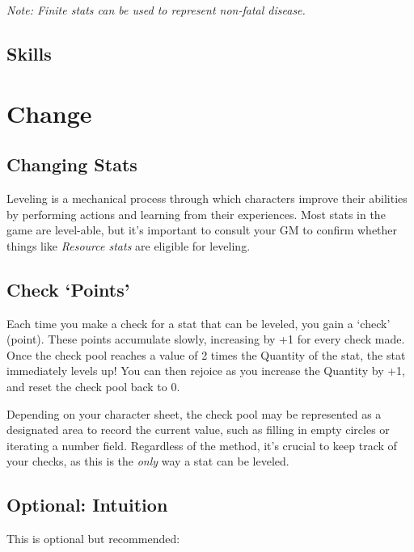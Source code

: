 \documentclass[../main.tex]{subfiles}
\begin{document}
        \emph{Note: Finite stats can be used to represent non-fatal disease.}
        \begin{mdframed}[style=Arrata]
            {\em
                \lipsum[1]
            }
        \end{mdframed}

    \subsection{Skills}

    \section{Change}

    \subsection{Changing Stats}\label{changing stats}

    Leveling is a mechanical process through which characters improve their abilities by performing actions and learning from their experiences. Most stats in the game are level-able, but it's important to consult your GM to confirm whether things like \emph{Resource stats} are eligible for leveling.

    \subsection{Check `Points'}

    Each time you make a check for a stat that can be leveled, you gain a `check' (point). These points accumulate slowly, increasing by +1 for every check made. Once the check pool reaches a value of 2 times the Quantity of the stat, the stat immediately levels up! You can then rejoice as you increase the Quantity by +1, and reset the check pool back to 0.

    Depending on your character sheet, the check pool may be represented as a designated area to record the current value, such as filling in empty circles or iterating a number field. Regardless of the method, it's crucial to keep track of your checks, as this is the \emph{only} way a stat can be leveled.

    \subsection{Optional: Intuition}
    
    This is optional but recommended:
\end{document}
